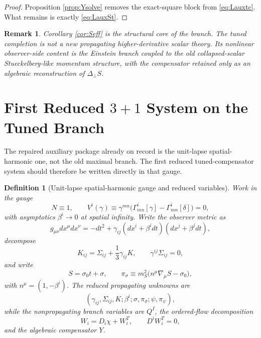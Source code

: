 \documentclass[11pt]{article}
\newtheorem{definition}{Definition}
\newtheorem{remark}{Remark}
\begin{document}
\begin{proof}
Proposition \ref{prop:Ysolve} removes the exact-square block from \eqref{eq:Lauxtc}. What remains is exactly \eqref{eq:LauxSt}.
\end{proof}

\begin{remark}
Corollary \ref{cor:Seff} is the structural core of the branch. The tuned completion is not a new propagating higher-derivative scalar theory. Its nonlinear observer-side content is the Einstein branch coupled to the old collapsed-scalar Stueckelberg-like momentum structure, with the compensator retained only as an algebraic reconstruction of \(\Delta_\perp S\).
\end{remark}

\section{First Reduced \texorpdfstring{\(3+1\)}{3+1} System on the Tuned Branch}

The repaired auxiliary package already on record is the unit-lapse spatial-harmonic one, not the old maximal branch. The first reduced tuned-compensator system should therefore be written directly in that gauge.

\begin{definition}[Unit-lapse spatial-harmonic gauge and reduced variables]
\label{def:gauge}
Work in the gauge
\begin{equation}
N\equiv 1,
\qquad
V^i(\gamma)\equiv \gamma^{mn}\bigl(\Gamma^i_{mn}[\gamma]-\Gamma^i_{mn}[\delta]\bigr)=0,
\label{eq:gauge}
\end{equation}
with asymptotics \(\beta^i\to 0\) at spatial infinity. Write the observer metric as
\begin{equation}
g_{\mu\nu}dx^\mu dx^\nu
=
-dt^2
+\gamma_{ij}(dx^i+\beta^idt)(dx^j+\beta^jdt),
\label{eq:ADM}
\end{equation}
decompose
\begin{equation}
K_{ij}
=
\Sigma_{ij}+\frac13\gamma_{ij}K,
\qquad
\gamma^{ij}\Sigma_{ij}=0,
\label{eq:Ksplit}
\end{equation}
and write
\begin{equation}
S=\sigma_0 t+\sigma,
\qquad
\pi_\sigma\equiv m_S^2\bigl(n^\mu\nabla_\mu S-\sigma_0\bigr),
\label{eq:pidef}
\end{equation}
with \(n^\mu=(1,-\beta^i)\). The reduced propagating unknowns are
\begin{equation}
(\gamma_{ij},\Sigma_{ij},K;\beta^i;\sigma,\pi_\sigma;\psi,\pi_\psi),
\label{eq:unknowns}
\end{equation}
while the nonpropagating branch variables are \(Q^I\), the ordered-flow decomposition
\begin{equation}
W_i=D_i\chi+W_i^T,
\qquad
D^iW_i^T=0,
\label{eq:Wdecomp}
\end{equation}
and the algebraic compensator \(Y\).
\end{definition}
\end{document}
